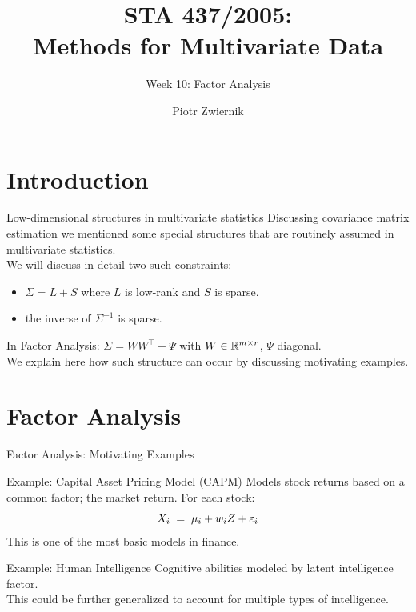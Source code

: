 \documentclass[11pt,handout,aspectratio=169]{beamer}
\title[STA437-Week1]{STA 437/2005: \\ Methods for Multivariate Data}
\subtitle[]{Week 10: Factor Analysis}
\author[Piotr Zwiernik]{Piotr Zwiernik}
\institute[UofT]{University of Toronto}
\date{}
\begin{document}
\maketitle
\section{Introduction}
\begin{frame}{Low-dimensional structures in multivariate statistics}
Discussing covariance matrix estimation we mentioned some special structures that are routinely assumed in multivariate statistics. \\[4mm]

We will discuss in detail two such constraints:
\begin{itemize}
	\item $\Sigma=L+S$ where $L$ is low-rank and $S$ is sparse. 
	\item the inverse of $\Sigma^{-1}$ is sparse.\\[4mm]
\end{itemize}

In Factor Analysis: $\Sigma=WW^\top +\Psi$ with $W\in \mathbb R^{m\times r}$, $\Psi$ diagonal.\\[4mm]

We explain here how such structure can occur by discussing motivating examples.

\end{frame}




\section{Factor Analysis }


\begin{frame}{Factor Analysis: Motivating Examples}
\begin{block}{Example: Capital Asset Pricing Model (CAPM)}
	Models stock returns based on a common factor; the \alert{market return}. For each stock:
	\[ X_i \;=\; \mu_i + w_i Z + \varepsilon_i \]
This is one of the most basic models in finance.
\end{block}
\begin{alertblock}{Example: Human Intelligence}
	Cognitive abilities modeled by latent \alert{intelligence factor}.\\[3mm]
	This could be further generalized to account for multiple types of intelligence.
\end{alertblock}
\end{frame}
\end{document}
